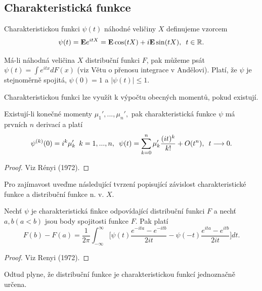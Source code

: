 \subsection{Charakteristická funkce}
\begin{definition}
Charakteristickou funkci $\psi(t)$ náhodné veličiny $X$ definujeme vzorcem
\begin{equation}
\psi(t) = \mathbf{E}e^{itX} = \mathbf{E}\cos(tX) + i\mathbf{E}\sin(tX), \enskip t \in \mathbb{R}.
\end{equation}
\end{definition}

\begin{remark}
Má-li náhodná veličina $X$ distribuční funkci $F$, pak můžeme psát $\psi(t) = \int e^{itx}dF(x)$ (viz Větu o přenosu integrace v Andělovi). Platí, že $\psi$ je stejnoměrně spojitá, $\psi(0) = 1$ a $|\psi(t)| \leq 1$.
\end{remark}

Charakteristickou funkci lze využít k výpočtu obecných momentů, pokud existují.
\begin{theorem}
Existují-li konečné momenty $\mu_{1}', ..., \mu_{n}',$ pak charakteristická funkce $\psi$ má prvních $n$ derivací a platí
\begin{equation}
\psi^{(k)}(0) = i^{k}\mu_{k}' \enskip k = 1, ..., n, \enskip \psi(t) = \sum_{k = 0}^{n}\mu_{k}' \frac{(it)^{k}}{k!} + O(t^{n}), \enskip t \longrightarrow 0.
\end{equation}
\end{theorem}
\begin{proof}
Viz Rényi (1972).
\end{proof}

Pro zajímavost uveďme následující tvrzení popisující závislost charakteristické funkce a distribuční funkce n. v. $X$.
\begin{theorem}
Nechť $\psi$ je charakteristická finkce odpovídající distribuční funkci $F$ a nechť $a, b (a < b)$ jsou body spojitosti funkce $F$. Pak platí
\begin{equation}
F(b) - F(a)  = \frac{1}{2\pi} \int_{-\infty}^{\infty}\bigg[ \psi(t) \frac{e^{-ita}-e^{-itb}}{2it} - \psi(-t)\frac{e^{ita}-e^{itb}}{2it} \bigg] dt.
\end{equation}
\end{theorem}
\begin{proof}
Viz Renyi (1972).
\end{proof}
Odtud plyne, že distribuční funkce je charakteristickou funkcí jednoznačně určena.

